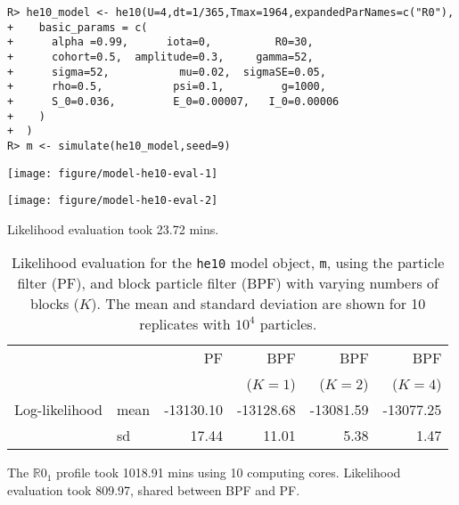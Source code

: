 \documentclass[12pt]{article}\usepackage[]{graphicx}\usepackage[]{xcolor}
\makeatletter
\newenvironment{kframe}{%
 \def\at@end@of@kframe{}%
 \ifinner\ifhmode%
  \def\at@end@of@kframe{\end{minipage}}%
  \begin{minipage}{\columnwidth}%
 \fi\fi%
 \def\FrameCommand##1{\hskip\@totalleftmargin \hskip-\fboxsep
 \colorbox{shadecolor}{##1}\hskip-\fboxsep
     \hskip-\linewidth \hskip-\@totalleftmargin \hskip\columnwidth}%
 \MakeFramed {\advance\hsize-\width
   \@totalleftmargin\z@ \linewidth\hsize
   \@setminipage}}%
 {\par\unskip\endMakeFramed%
 \at@end@of@kframe}
\newenvironment{knitrout}{}{} %
\newcommand\code[1]{\texttt{#1}}
\newcommand\R{\mathbb{R}}
\makeatother
\begin{document}
\begin{knitrout}
\color{fgcolor}\begin{kframe}
\begin{verbatim}
R> he10_model <- he10(U=4,dt=1/365,Tmax=1964,expandedParNames=c("R0"),
+    basic_params = c(
+      alpha =0.99,      iota=0,          R0=30,
+      cohort=0.5,  amplitude=0.3,     gamma=52,
+      sigma=52,           mu=0.02,  sigmaSE=0.05,
+      rho=0.5,           psi=0.1,         g=1000,
+      S_0=0.036,         E_0=0.00007,   I_0=0.00006
+    )
+  )
R> m <- simulate(he10_model,seed=9)
\end{verbatim}
\end{kframe}
\end{knitrout}

\begin{knitrout}
\color{fgcolor}

\texttt{[image: figure/model-he10-eval-1]} \hfill{}




\texttt{[image: figure/model-he10-eval-2]} \hfill{}


\end{knitrout}



Likelihood evaluation took 23.72 mins.

\begin{table}
\begin{tabular}{llrrrr}
               & & PF & BPF & BPF & BPF
	       \\
               & &  & ($K=1$) & ($K=2$) & ($K=4$)
	       
\\
\hline
Log-likelihood & mean &
  -13130.10 &
  -13128.68 &
  -13081.59 &
  -13077.25 
\\  
               & sd &
  17.44 &
  11.01 &
  5.38 &
  1.47 
\end{tabular}
\caption{Likelihood evaluation for the \code{he10} model object, \code{m}, using the particle filter (PF), and block particle filter (BPF) with varying numbers of blocks ($K$).
The mean and standard deviation are shown for 10 replicates with $10^4$ particles.
}\label{tab:m-lik-eval}
\end{table}







The $\R0_1$ profile took 1018.91 mins using 10 computing cores.
Likelihood evaluation took 809.97, shared between BPF and PF.
\end{document}
